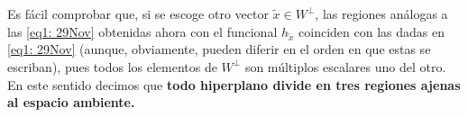 Es fácil comprobar que,
si se escoge otro vector $\tilde{x} \in W^{\perp}$,
las regiones análogas a las
\eqref{eq1: 29Nov} obtenidas ahora con el funcional
$h_{\tilde{x}}$ coinciden con las dadas en \eqref{eq1: 29Nov}
(aunque,
obviamente, pueden diferir en el orden en que estas se escriban),
pues todos los elementos de $W^{\perp}$ son múltiplos
escalares uno del otro.
En este sentido decimos que \textbf{todo hiperplano
divide en tres regiones ajenas al espacio ambiente.}



